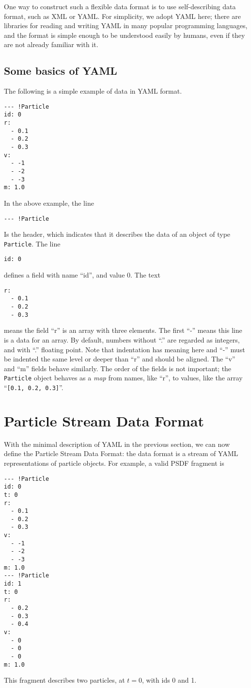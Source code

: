 \documentclass[5p,authoryear]{elsarticle}
\begin{document}
One way to construct such a flexible data format is to use
self-describing data format, such as XML or YAML. For simplicity, we
adopt YAML \citep{YAML2011} here; there are libraries for reading and
writing YAML in many popular programming languages, and the format is
simple enough to be understood easily by humans, even if they are not
already familiar with it.

\subsection{Some basics of YAML}

The following is a simple example of data in YAML format.
\begin{verbatim}
--- !Particle
id: 0
r:
  - 0.1
  - 0.2
  - 0.3
v:
  - -1
  - -2
  - -3
m: 1.0
\end{verbatim}
In the above example, the line
\begin{verbatim}
--- !Particle
\end{verbatim}
Is the header, which indicates that it describes the data of an object
of type {\tt Particle}.  The line
\begin{verbatim}
id: 0
\end{verbatim}
defines a field with name ``id'', and value 0.  The text
\begin{verbatim}
r:
  - 0.1
  - 0.2
  - 0.3
\end{verbatim}
means the field ``r'' is an array with three elements. The first ``-''
means this line is a data for an array.  By default, numbers without
``.'' are regarded as integers, and with ``.'' floating point. Note
that indentation has meaning here and ``-'' must be indented the same
level or deeper than ``r'' and should be aligned.  The ``v'' and ``m''
fields behave similarly.  The order of the fields is not important;
the {\tt Particle} object behaves as a \emph{map} from names, like
``r'', to values, like the array ``\verb|[0.1, 0.2, 0.3]|''.

\section{Particle Stream Data Format}

With the minimal description of YAML in the previous section, we can
now define the Particle Stream Data Format: the data format is a
stream of YAML representations of particle objects.  For example, a
valid PSDF fragment is
\begin{verbatim}
--- !Particle
id: 0
t: 0
r:
  - 0.1
  - 0.2
  - 0.3
v:
  - -1
  - -2
  - -3
m: 1.0
--- !Particle
id: 1
t: 0
r:
  - 0.2
  - 0.3
  - 0.4
v:
  - 0
  - 0
  - 0
m: 1.0
\end{verbatim}
This fragment describes two particles, at $t = 0$, with ids 0 and 1.
\end{document}
